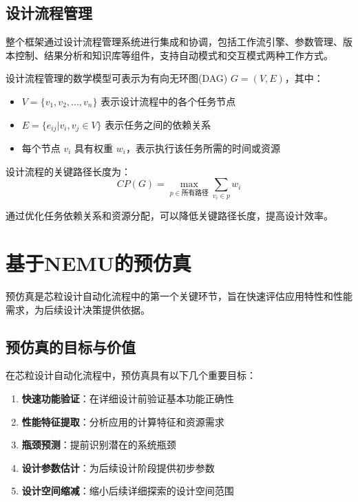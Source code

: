 \documentclass[bachelor]{thesis-uestc}
\begin{document}
\subsection{设计流程管理}

整个框架通过设计流程管理系统进行集成和协调，包括工作流引擎、参数管理、版本控制、结果分析和知识库等组件，支持自动模式和交互模式两种工作方式。

设计流程管理的数学模型可表示为有向无环图(DAG) $G = (V, E)$，其中：
\begin{itemize}
    \item $V = \{v_1, v_2, ..., v_n\}$ 表示设计流程中的各个任务节点
    \item $E = \{e_{ij} | v_i, v_j \in V\}$ 表示任务之间的依赖关系
    \item 每个节点 $v_i$ 具有权重 $w_i$，表示执行该任务所需的时间或资源
\end{itemize}

设计流程的关键路径长度为：
\begin{equation}
CP(G) = \max_{p \in \text{所有路径}} \sum_{v_i \in p} w_i
\end{equation}

通过优化任务依赖关系和资源分配，可以降低关键路径长度，提高设计效率。

\section{基于NEMU的预仿真}

预仿真是芯粒设计自动化流程中的第一个关键环节，旨在快速评估应用特性和性能需求，为后续设计决策提供依据。

\subsection{预仿真的目标与价值}

在芯粒设计自动化流程中，预仿真具有以下几个重要目标：

\begin{enumerate}
    \item \textbf{快速功能验证}：在详细设计前验证基本功能正确性
    \item \textbf{性能特征提取}：分析应用的计算特征和资源需求
    \item \textbf{瓶颈预测}：提前识别潜在的系统瓶颈
    \item \textbf{设计参数估计}：为后续设计阶段提供初步参数
    \item \textbf{设计空间缩减}：缩小后续详细探索的设计空间范围
\end{enumerate}
\end{document}
